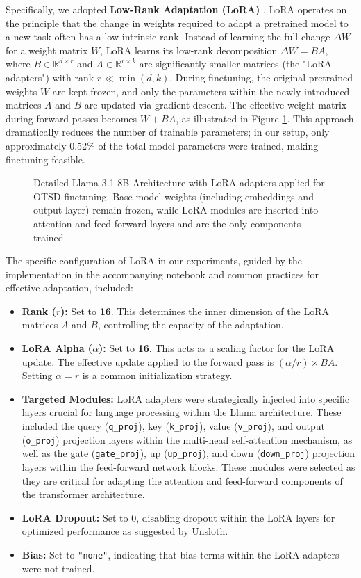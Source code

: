 \documentclass[twocolumn,11pt,letterpaper]{article}
\begin{document}
Specifically, we adopted \textbf{Low-Rank Adaptation (LoRA)} \cite{lora}. LoRA operates on the principle that the change in weights required to adapt a pretrained model to a new task often has a low intrinsic rank. Instead of learning the full change $\Delta W$ for a weight matrix $W$, LoRA learns its low-rank decomposition $\Delta W = BA$, where $B \in \mathbb{R}^{d \times r}$ and $A \in \mathbb{R}^{r \times k}$ are significantly smaller matrices (the "LoRA adapters") with rank $r \ll \min(d, k)$. During finetuning, the original pretrained weights $W$ are kept frozen, and only the parameters within the newly introduced matrices $A$ and $B$ are updated via gradient descent. The effective weight matrix during forward passes becomes $W + BA$, as illustrated in Figure \ref{fig:llama_lora_arch}. This approach dramatically reduces the number of trainable parameters; in our setup, only approximately 0.52\% of the total model parameters were trained, making finetuning feasible.

\begin{figure}[htbp]
\centering

\caption{Detailed Llama 3.1 8B Architecture with LoRA adapters applied for OTSD finetuning. Base model weights (including embeddings and output layer) remain frozen, while LoRA modules are inserted into attention and feed-forward layers and are the only components trained.}
\label{fig:llama_lora_arch}
\end{figure}

The specific configuration of LoRA in our experiments, guided by the implementation in the accompanying notebook and common practices for effective adaptation, included:
\begin{itemize}
    \item \textbf{Rank ($r$):} Set to \textbf{16}. This determines the inner dimension of the LoRA matrices $A$ and $B$, controlling the capacity of the adaptation.
    \item \textbf{LoRA Alpha ($\alpha$):} Set to \textbf{16}. This acts as a scaling factor for the LoRA update. The effective update applied to the forward pass is $(\alpha / r) \times BA$. Setting $\alpha = r$ is a common initialization strategy.
    \item \textbf{Targeted Modules:} LoRA adapters were strategically injected into specific layers crucial for language processing within the Llama architecture. These included the query (\texttt{q\_proj}), key (\texttt{k\_proj}), value (\texttt{v\_proj}), and output (\texttt{o\_proj}) projection layers within the multi-head self-attention mechanism, as well as the gate (\texttt{gate\_proj}), up (\texttt{up\_proj}), and down (\texttt{down\_proj}) projection layers within the feed-forward network blocks. These modules were selected as they are critical for adapting the attention and feed-forward components of the transformer architecture.
    \item \textbf{LoRA Dropout:} Set to 0, disabling dropout within the LoRA layers for optimized performance as suggested by Unsloth.
    \item \textbf{Bias:} Set to \texttt{"none"}, indicating that bias terms within the LoRA adapters were not trained.
\end{itemize}
\end{document}
